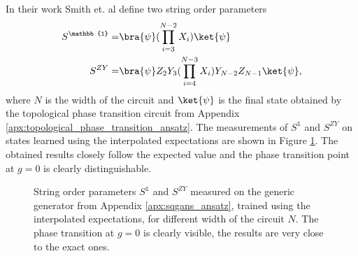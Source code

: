 In their work Smith et. al \cite{smith2020crossing} define two
string order parameters
\begin{equation}
\begin{split}
S^\mathbb{1} =  & \bra{\psi}(\prod_{i=3}^{N-2}X_i)\ket{\psi} \\
S^{ZY} =  & \bra{\psi}Z_2Y_3(\prod_{i=4}^{N-3}X_i)Y_{N-2}Z_{N-1}\ket{\psi},
\end{split}
\end{equation}
where $N$ is the width of the circuit and $\ket{\psi}$ is the final state
obtained by the topological phase transition circuit from Appendix
\ref{apx:topological_phase_transition_ansatz}.
The measurements of $S^{\mathbb{1}}$ and $S^{ZY}$ on states learned using the
interpolated expectations are shown in Figure \ref{fig:string_order_1}. The
obtained results closely follow the expected value and the phase transition
point at $g=0$ is clearly distinguishable.

\begin{figure}[htbp!]
  \captionsetup[subfigure]{labelformat=empty}
  \centering

  \caption{String order parameters $S^\mathbb{1}$ and $S^{ZY}$ measured on the
    generic generator from Appendix \ref{apx:sqgans_ansatz}, trained using the
    interpolated expectations, for different width of the circuit $N$.
    The phase transition at $g=0$ is clearly visible,
    the results are very close to the exact ones.}
\label{fig:string_order_1}
\end{figure}

